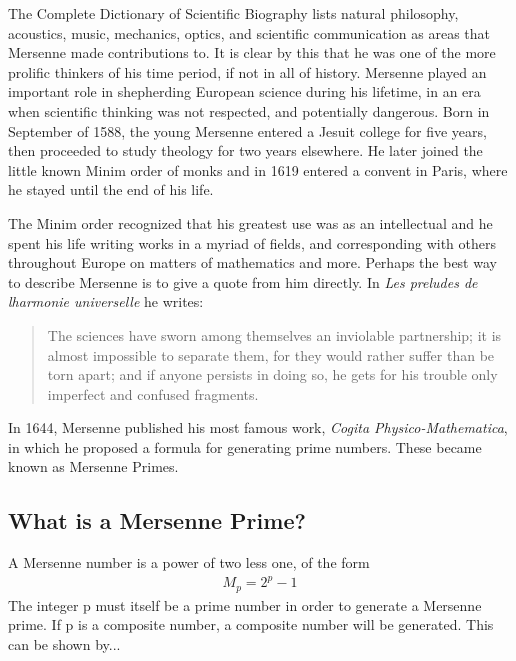 
The Complete Dictionary of Scientific Biography\cite{scibio} lists natural philosophy, acoustics, music, mechanics, optics, and scientific communication as areas that Mersenne made contributions to.  It is clear by this that he was one of the more prolific thinkers of his time period, if not in all of history. Mersenne played an important role in shepherding European science during his lifetime, in an era when scientific thinking was not respected, and potentially dangerous.  Born in September of 1588, the young Mersenne entered a Jesuit college for five years, then proceeded to study theology for two years elsewhere. He later joined the little known Minim order of monks and in 1619 entered a convent in Paris, where he stayed until the end of his life.  

The Minim order recognized that his greatest use was as an intellectual and he spent his life writing works in a myriad of fields, and corresponding with others throughout Europe on matters of mathematics and more. Perhaps the best way to describe Mersenne is to give a quote from him directly. In \emph{Les preludes de lharmonie universelle} he writes:

\begin{quote}
The sciences have sworn among themselves an inviolable partnership; it is almost impossible to separate them, for they would rather suffer than be torn apart; and if anyone persists in doing so, he gets for his trouble only imperfect and confused fragments. \cite{lfrench}
\end{quote}

In 1644, Mersenne published his most famous work, \emph{Cogita Physico-Mathematica}, in which he proposed a formula for generating prime numbers. These became known as Mersenne Primes.

\subsection{What is a Mersenne Prime?}

A Mersenne number is a power of two less one, of the form
\begin{align}
M_p = 2^p - 1
\end{align}
The integer p must itself be a prime number in order to generate a Mersenne prime. If p is a
composite number, a composite number will be generated. This can be shown by...

